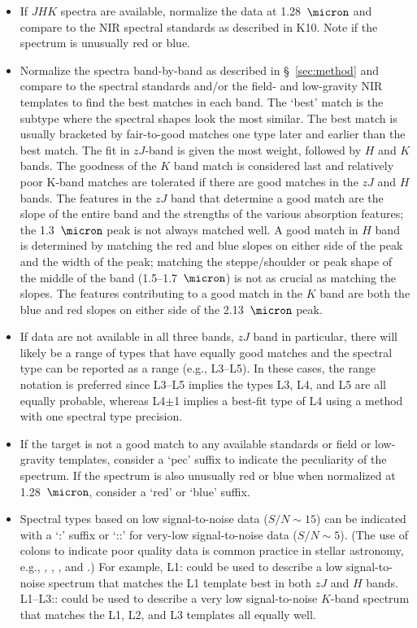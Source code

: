 \documentclass[12pt,preprint]{aastex}
\begin{document}
\begin{itemize}
	\item If $JHK$ spectra are available, normalize the data at 1.28~$\micron$ and compare to the NIR spectral standards as described in K10. Note if the spectrum is unusually red or blue.
	
	\item Normalize the spectra band-by-band as described in \S~\ref{sec:method} and compare to the spectral standards and/or the field- and low-gravity NIR templates to find the best matches in each band.
	The `best' match is the subtype where the spectral shapes look the most similar. The best match is usually bracketed by fair-to-good matches one type later and earlier than the best match.
	The fit in $zJ$-band is given the most weight, followed by $H$ and $K$ bands. The goodness of the $K$ band match is considered last and relatively poor K-band matches are tolerated if there are good matches in the $zJ$ and $H$ bands. 
	The features in the $zJ$ band that determine a good match are the slope of the entire band and the strengths of the various absorption features; the 1.3~$\micron$ peak is not always matched well. 
	A good match in $H$ band is determined by matching the red and blue slopes on either side of the peak and the width of the peak; matching the steppe/shoulder or peak shape of the middle of the band (1.5--1.7~$\micron$) is not as crucial as matching the slopes. 
The features contributing to a good match in the $K$ band are both the blue and red slopes on either side of the 2.13~$\micron$ peak.	
	\item If data are not available in all three bands, $zJ$ band in particular, there will likely be a range of types that have equally good matches and the spectral type can be reported as a range (e.g., L3--L5). In these cases, the range notation is preferred since L3--L5 implies the types L3, L4, and L5 are all equally probable, whereas L4$\pm$1 implies a best-fit type of L4 using a method with one spectral type precision.
	\item If the target is not a good match to any available standards or field or low-gravity templates, consider a `pec' suffix to indicate the peculiarity of the spectrum. If the spectrum is also unusually red or blue when normalized at 1.28~$\micron$, consider a `red' or `blue' suffix.
	\item Spectral types based on low signal-to-noise data ($S/N\sim15$) can be indicated with a `:' suffix or `::' for very-low signal-to-noise data ($S/N\sim5$). 
	(The use of colons to indicate poor quality data is common practice in stellar astronomy, e.g., \citet{Sanduleak:1988fn}, \cite{Silvestri:2006el}, \citet[Table 12.1]{Gray:2009wd}, and \cite{Covey:2010de}.) For example, L1: could be used to describe a low signal-to-noise spectrum that matches the L1 template best in both $zJ$ and $H$ bands. L1--L3:: could be used to describe a very low signal-to-noise $K$-band spectrum that matches the L1, L2, and L3 templates all equally well. %

\end{itemize}	
\end{document}

